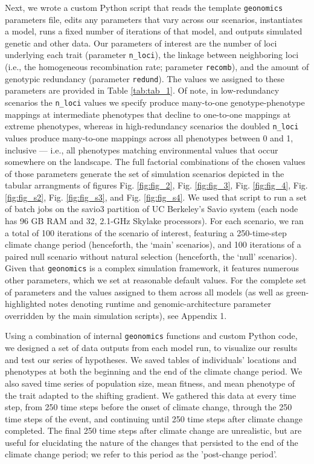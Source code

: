 \documentclass[9pt,twocolumn,twoside,lineno]{pnas-new}
\begin{document}
{Next, we wrote a custom Python script that reads the template \texttt{geonomics}
parameters file, edits any parameters that vary 
across our scenarios, instantiates a model, runs a fixed number of iterations 
of that model, and outputs simulated genetic and other data. 
Our parameters of interest are the number of loci underlying
each trait (parameter \texttt{n\_loci}),
the linkage between neighboring loci
(i.e., the homogeneous recombination rate; parameter \texttt{recomb}),
and the amount of genotypic redundancy (parameter \texttt{redund}).
The values we assigned to these parameters are provided in Table \ref{tab:tab_1}.
Of note, in low-redundancy scenarios the \texttt{n\_loci} values we specify
produce many-to-one genotype-phenotype mappings at intermediate phenotypes
that decline to one-to-one mappings at extreme phenotypes,
whereas in high-redundancy scenarios the doubled \texttt{n\_loci} values
produce many-to-one mappings across all phenotypes between 0 and 1, inclusive
--- i.e., all phenotypes matching environmental values
that occur somewhere on the landscape.
The full factorial combinations of the chosen values of those parameters generate the set
of simulation scenarios depicted in the tabular arrangments of figures
Fig. \ref{fig:fig_2}, Fig. \ref{fig:fig_3}, Fig. \ref{fig:fig_4}, Fig. \ref{fig:fig_s2}, Fig. \ref{fig:fig_s3}, and Fig. \ref{fig:fig_s4}.
We used that script to run a set of batch jobs on the 
savio3 partition of UC Berkeley’s Savio system (each node has 96 GB RAM and 32, 
2.1-GHz Skylake processors). For each scenario, we ran a total of 100 iterations of 
the scenario of interest, featuring a 250-time-step climate change period (henceforth, 
the ‘main’ scenarios), and 100 iterations of a paired null scenario without natural 
selection (henceforth, the ‘null’ scenarios). 
Given that \texttt{geonomics} is a complex simulation framework, it features numerous other 
parameters, which we set at reasonable default values.
For the complete set of parameters and the values 
assigned to them across all models
(as well as green-highlighted notes denoting runtime and genomic-architecture
parameter overridden by the main simulation scripts), see Appendix 1.

Using a combination of internal \texttt{geonomics} functions and custom Python code, we 
designed a set of data outputs from each model run, to visualize our
results and test our series of hypotheses.
We saved tables of individuals’ locations and phenotypes at both
the beginning and the end of the climate change period. We also saved time 
series of population size, mean fitness, and mean phenotype of the trait adapted to 
the shifting gradient. We gathered this data at every time step, from 250 time steps 
before the onset of climate change, through the 250 time steps of the event, and 
continuing until 250 time steps after climate change completed.
The final 250 time steps after climate change are unrealistic, but are useful
for elucidating the nature of the changes that persisted to the end of the climate change period;
we refer to this period as the 'post-change period'.

}
\end{document}
